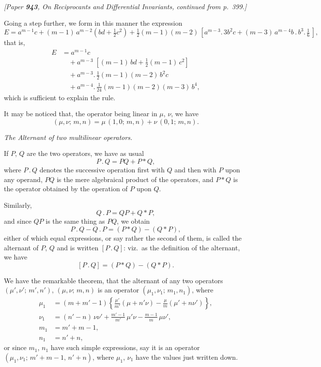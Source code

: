 \documentclass[11pt]{article}
\begin{document}
\begin{center}
\textit{[Paper \textbf{943}, On Reciprocants and Differential Invariants, continued from p.\ 399.]}
\end{center}

\medskip
Going a step further, we form in this manner the expression
\[
E = a^{m-1}c + (m-1)\,a^{m-2}(bd+\tfrac{1}{2}c^{2})
   + \tfrac{1}{2}(m-1)(m-2)\,[a^{m-3}.\,3b^{2}c + (m-3)\,a^{m-4}b\,.\,b^{3}.\,\tfrac{1}{6}\,],
\]
that is,
\begin{align*}
E &= a^{m-1}c\\
  &\quad + a^{m-3}\;[(m-1)\,bd + \tfrac{1}{2}(m-1)\,c^{2}]\\
  &\quad + a^{m-3}.\,\tfrac{1}{2}(m-1)(m-2)\,b^{2}c\\
  &\quad + a^{m-4}.\,\tfrac{1}{24}(m-1)(m-2)(m-3)\,b^{4},
\end{align*}
which is sufficient to explain the rule.

It may be noticed that, the operator being linear in $\mu$, $\nu$, we have
\[ (\mu,\nu;\,m,n) = \mu\,(1,0;\,m,n) + \nu\,(0,1;\,m,n). \]

\medskip
\textit{The Alternant of two multilinear operators.}

\medskip
If $P$, $Q$ are the two operators, we have as usual
\[ P\,.\,Q = PQ + P*Q, \]
where $P\,.\,Q$ denotes the successive operation first with $Q$ and then with $P$ upon any operand, $PQ$ is the mere algebraical product of the operators, and $P*Q$ is the operator obtained by the operation of $P$ upon $Q$.

Similarly,
\[ Q\,.\,P = QP + Q*P, \]
and since $QP$ is the same thing as $PQ$, we obtain
\[ P\,.\,Q - Q\,.\,P = (P*Q) - (Q*P), \]
either of which equal expressions, or say rather the second of them, is called the alternant of $P$, $Q$ and is written $[P\,.\,Q]$: viz.\ as the definition of the alternant, we have
\[ [P\,.\,Q] = (P*Q) - (Q*P). \]

We have the remarkable theorem, that the alternant of any two operators $(\mu',\nu';\,m',n')$, $(\mu,\nu;\,m,n)$ is an operator $(\mu_{1},\nu_{1};\,m_{1},n_{1})$, where
\begin{align*}
\mu_{1} &= (m+m'-1)\left\{\tfrac{\mu'}{m'}(\mu+n'\nu) - \tfrac{\mu}{m}(\mu'+n\nu')\right\},\\
\nu_{1} &= (n'-n)\,\nu\nu' + \tfrac{m'-1}{m'}\,\mu'\nu - \tfrac{m-1}{m}\,\mu\nu',\\
m_{1} &= m'+m-1,\\
n_{1} &= n'+n,
\end{align*}
or since $m_{1}$, $n_{1}$ have such simple expressions, say it is an operator $(\mu_{1},\nu_{1};\,m'+m-1,\,n'+n)$, where $\mu_{1}$, $\nu_{1}$ have the values just written down.
\end{document}
